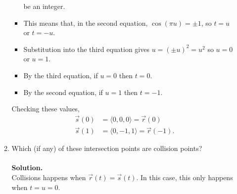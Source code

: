 \documentclass[12 pt]{article}
\begin{document}
\begin{enumerate}
\begin{enumerate}
\begin{itemize}
        be an integer.
        \item This means that, in the second equation, $\cos(\pi u) = \pm 1$, so
        $t = u$ or $t = -u$.
        \item Substitution into the third equation gives
        $u = (\pm u)^2 = u^2$ so $u = 0$ or $u = 1$.
        \item By the third equation, if $u = 0$ then $t = 0$.
        \item By the second equation, if $u = 1$ then $t = -1$.
      \end{itemize}
      Checking these values, \begin{align*}
        \vec s(0) &= \langle 0, 0, 0 \rangle = \vec r(0) \\
        \vec s(1) &= \langle 0, -1, 1 \rangle = \vec r(-1).
      \end{align*}

			\item Which (if any) of these intersection points are collision points?
      \\~\\
      \textbf{Solution.}
      \\
      Collisions happens when $\vec r(t) = \vec s(t)$.
      In this case, this only happens when $t = u = 0$.
		\end{enumerate}
  \end{enumerate}
\end{document}
